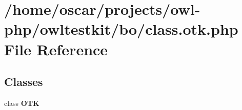 \section{/home/oscar/projects/owl-\/php/owltestkit/bo/class.otk.php File Reference}
\label{class_8otk_8php}
\subsection*{Classes}
\begin{DoxyCompactItemize}
\item 
class {\bf OTK}
\end{DoxyCompactItemize}
